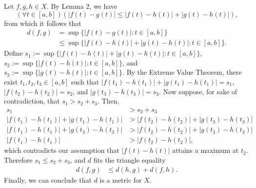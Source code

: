 \documentclass[12pt,a4paper]{article}
\theoremstyle{theorem}
\theoremstyle{definition}
\begin{document}
Let $f,  g,  h \in X$.  By Lemma 2,  we have
\begin{equation*}
(\forall t \in [a,  b])(|f(t) - g(t)| \leq |f(t) - h(t)| + |g(t) - h(t)|) \text{,}
\end{equation*}
from which it follows that 
\begin{align*}
d(f,  g) &= \sup \{|f(t) - g(t)| : t \in [a, b] \}\\
&\leq \sup \{|f(t) - h(t)| + |g(t) - h(t)|: t \in [a, b] \}.
\end{align*}
Define $s_1 := \sup \{|f(t) - h(t)| + |g(t) - h(t)|: t \in [a, b] \}$,  $s_2 := \sup \{|f(t) - h(t)| : t \in [a, b] \}$,  and $s_3 := \sup \{|g(t) - h(t)| : t \in [a, b] \}$.  By the Extreme Value Theorem,  there exist $t_1,  t_2,  t_3 \in [a,  b]$ such that $|f(t_1) - h(t_1)| + |g(t_1) - h(t_1)| = s_1$,  $|f(t_2) - h(t_2)| = s_2$,  and $|g(t_3) - h(t_3)| = s_3$.  Now suppose,  for sake of contradiction,  that $s_1 > s_2 + s_3$. Then,  
\begin{align*}
s_1 &> s_2 + s_3\\
|f(t_1) - h(t_1)| + |g(t_1) - h(t_1)| &> |f(t_2) - h(t_2)| + |g(t_3) - h(t_3)| \\
|f(t_1) - h(t_1)| + |g(t_3) - h(t_3)| &> |f(t_2) - h(t_2)| + |g(t_3) - h(t_3)| \\
|f(t_1) - h(t_1)|  &> |f(t_2) - h(t_2)| \text{,}
\end{align*}
which contradicts our assumption that $|f(t) - h(t)|$ attains a maximum at $t_2$. Therefore $s_1 \leq s_2 + s_3$,  and $d$ fits the triangle equality
\begin{align*}
d(f,  g) &\leq d(h, g) + d(f, h).
\end{align*}
Finally,  we can conclude that $d$ is a metric for $X$.
\end{document}
